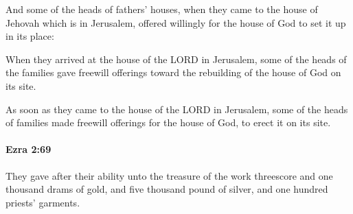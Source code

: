 			\begin{versebox}
					\item[BHS] 
					\item[LXX] 
					\item[ASV] And some of the heads of fathers' houses, when they came to the house of Jehovah which is in Jerusalem, offered willingly for the house of God to set it up in its place:
					\item[NIV] When they arrived at the house of the LORD in Jerusalem, some of the heads of the families gave freewill offerings toward the rebuilding of the house of God on its site.
					\item[NRSV] As soon as they came to the house of the LORD in Jerusalem, some of the heads of families made freewill offerings for the house of God, to erect it on its site.
			\end{versebox}

		\paragraph{Ezra 2:69} %
			\label{EZRA-2-69}

			They gave after their ability unto the treasure of the work threescore and one thousand drams of gold, and five thousand pound of silver, and one hundred priests’ garments.

